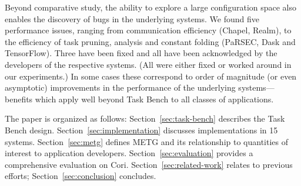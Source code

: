 

Beyond comparative study, the ability to explore a large configuration
space also enables the discovery of bugs in the underlying systems. We
found five performance issues, ranging from communication efficiency
(Chapel, Realm), to the efficiency of task pruning, analysis and
constant folding (PaRSEC, Dask and TensorFlow). Three have been fixed
and all have been acknowledged by the developers of the respective
systems. (All were either fixed or worked around in our experiments.)
In some cases these correspond to order of magnitude (or even
asymptotic) improvements in the performance of the underlying
systems---benefits which apply well beyond Task Bench to all classes
of applications.

The paper is organized as follows: Section~\ref{sec:task-bench}
describes the Task Bench design. Section~\ref{sec:implementation}
discusses implementations in 15 systems.  Section~\ref{sec:metg}
defines METG and its relationship to quantities of interest to
application developers.  Section~\ref{sec:evaluation} provides a
comprehensive evaluation on Cori. Section~\ref{sec:related-work} relates to
previous efforts; Section~\ref{sec:conclusion} concludes.
